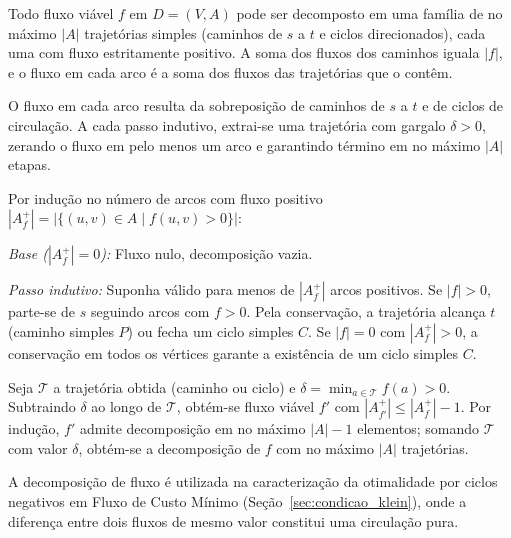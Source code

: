 \begin{teorema}
Todo fluxo viável $f$ em $D = (V, A)$ pode ser decomposto em uma família de no máximo $|A|$ trajetórias simples (caminhos de $s$ a $t$ e ciclos direcionados), cada uma com fluxo estritamente positivo. A soma dos fluxos dos caminhos iguala $|f|$, e o fluxo em cada arco é a soma dos fluxos das trajetórias que o contêm.
\end{teorema}

 O fluxo em cada arco resulta da sobreposição de caminhos de $s$ a $t$ e de ciclos de circulação. A cada passo indutivo, extrai-se uma trajetória com gargalo $\delta > 0$, zerando o fluxo em pelo menos um arco e garantindo término em no máximo $|A|$ etapas.

\begin{demonstracao}
Por indução no número de arcos com fluxo positivo $|A_f^+| = |\{(u,v) \in A \mid f(u,v) > 0\}|$:

\medskip
\noindent \textit{Base ($|A_f^+| = 0$):} Fluxo nulo, decomposição vazia.

\medskip
\noindent \textit{Passo indutivo:} Suponha válido para menos de $|A_f^+|$ arcos positivos. Se $|f| > 0$, parte-se de $s$ seguindo arcos com $f > 0$. Pela conservação, a trajetória alcança $t$ (caminho simples $P$) ou fecha um ciclo simples $C$. Se $|f| = 0$ com $|A_f^+| > 0$, a conservação em todos os vértices garante a existência de um ciclo simples $C$.

Seja $\mathcal{T}$ a trajetória obtida (caminho ou ciclo) e $\delta = \min_{a \in \mathcal{T}} f(a) > 0$. Subtraindo $\delta$ ao longo de $\mathcal{T}$, obtém-se fluxo viável $f'$ com $|A_{f'}^+| \le |A_f^+| - 1$. Por indução, $f'$ admite decomposição em no máximo $|A| - 1$ elementos; somando $\mathcal{T}$ com valor $\delta$, obtém-se a decomposição de $f$ com no máximo $|A|$ trajetórias.
\end{demonstracao}

A decomposição de fluxo é utilizada na caracterização da otimalidade por ciclos negativos em Fluxo de Custo Mínimo (Seção~\ref{sec:condicao_klein}), onde a diferença entre dois fluxos de mesmo valor constitui uma circulação pura.

